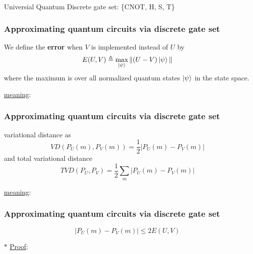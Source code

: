 \documentclass[9pt]{beamer}
\begin{document}
    \begin{section}{Universial Quantum Discrete gate set: \{CNOT, H, S, T\}}

        \begin{frame}
            \frametitle{Approximating quantum circuits via discrete gate set}
                \begin{definition}\label{def:error}
                    We define the \textbf{error} when $V$ is implemented instead of $U$ by
                    $$E(U,V) \triangleq \max_{\ket{\psi}} \|(U-V) \ket{\psi}\|$$
                    where the maximum is over all normalized quantum states $\ket{\psi}$ in the state space.
                \end{definition}
                \vspace{0.2cm}
                \checkmark \underline{meaning}:
            
        
        \end{frame}

        \begin{frame}
            \frametitle{Approximating quantum circuits via discrete gate set}
                \begin{definition}\label{def:vari-dist}
                    variational distance as 
                    $$VD(P_U(m), P_V(m)) = \frac{1}{2} |P_U(m) - P_V(m)|$$
                    and total variational distance 
                    $$TVD(P_U, P_V) = \frac{1}{2} \sum_m |P_U(m) - P_V(m) |$$
                \end{definition}
                \vspace{0.2cm}
                \checkmark \underline{meaning}:
            
        
        \end{frame}

        \begin{frame}
            \frametitle{Approximating quantum circuits via discrete gate set}
                \begin{theorem}\label{thr:gate-error}
                    $$ \left|P_U(m)-P_V(m)\right| \leq 2 E(U, V) $$
                \end{theorem}
                \vspace{0.2cm}
                $\ast$ \underline{Proof}:

        
        \end{frame}


\end{section}
\end{document}
